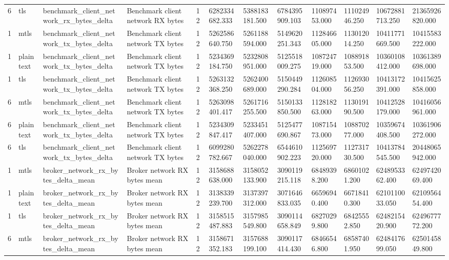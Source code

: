 \begin{longtable}{llllllllllll}
6 & tls & benchmark\_client\_network\_rx\_bytes\_delta & Benchmark client network RX bytes & 12 & 6282334682.333 & 5388183181.500 & 6784395909.103 & 110897453.000 & 111024946.250 & 10672881713.250 & 21365926820.000 \\
1 & mtls & benchmark\_client\_network\_tx\_bytes\_delta & Benchmark client network TX bytes & 12 & 5262586640.750 & 5261188594.000 & 5149620251.343 & 112846605.000 & 113012014.250 & 10411771669.500 & 10415583222.000 \\
1 & plaintext & benchmark\_client\_network\_tx\_bytes\_delta & Benchmark client network TX bytes & 12 & 5234369184.750 & 5232808951.000 & 5125518009.275 & 108724719.000 & 108891853.500 & 10360108412.000 & 10361389698.000 \\
1 & tls & benchmark\_client\_network\_tx\_bytes\_delta & Benchmark client network TX bytes & 12 & 5263132368.250 & 5262400689.000 & 5150449290.284 & 112608504.000 & 112693056.250 & 10413172391.000 & 10415625858.000 \\
6 & mtls & benchmark\_client\_network\_tx\_bytes\_delta & Benchmark client network TX bytes & 12 & 5263098401.417 & 5261716255.500 & 5150133850.500 & 112818263.000 & 113019190.500 & 10412528179.000 & 10416056961.000 \\
6 & plaintext & benchmark\_client\_network\_tx\_bytes\_delta & Benchmark client network TX bytes & 12 & 5234309847.417 & 5233451407.000 & 5125477690.867 & 108715473.000 & 108870277.000 & 10359674408.500 & 10361906272.000 \\
6 & tls & benchmark\_client\_network\_tx\_bytes\_delta & Benchmark client network TX bytes & 12 & 6099280782.667 & 5262278040.000 & 6544610902.223 & 112569720.000 & 112731730.500 & 10413784545.500 & 20448065942.000 \\
1 & mtls & broker\_network\_rx\_bytes\_delta\_mean & Broker network RX bytes mean & 12 & 3158688638.000 & 3158052133.900 & 3090119215.118 & 68489398.200 & 68601021.200 & 6248953362.400 & 6249742069.400 \\
1 & plaintext & broker\_network\_rx\_bytes\_delta\_mean & Broker network RX bytes mean & 12 & 3138339239.700 & 3137397312.000 & 3071646833.035 & 66596940.400 & 66718410.300 & 6210110033.050 & 6210956454.400 \\
1 & tls & broker\_network\_rx\_bytes\_delta\_mean & Broker network RX bytes mean & 12 & 3158515487.883 & 3157985549.800 & 3090114658.849 & 68270299.800 & 68425552.850 & 6248215420.900 & 6249677772.200 \\
6 & mtls & broker\_network\_rx\_bytes\_delta\_mean & Broker network RX bytes mean & 12 & 3158671352.183 & 3157688199.100 & 3090117414.430 & 68466546.800 & 68587401.950 & 6248417699.050 & 6250145849.800 \\

\end{longtable}
